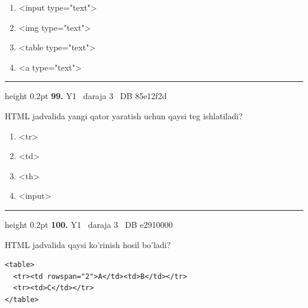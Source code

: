 \documentclass[10pt,a4paper,oneside]{article}
\begin{document}
\begin{enumerate}[label=\Alph*),leftmargin=9mm]
\item \textless{}input type="text"\textgreater{}
\item \textless{}img type="text"\textgreater{}
\item \textless{}table type="text"\textgreater{}
\item \textless{}a type="text"\textgreater{}
\end{enumerate}
\vspace{2mm}\hrule height 0.2pt \vspace{4mm}
\hypertarget{q99}{\textbf{\color{ink}99.}}  {\color{muted}\scriptsize Y1 \textbullet\ daraja 3 \textbullet\ DB 85e12f2d}
\par
HTML jadvalida yangi qator yaratish uchun qaysi teg ishlatiladi?
\begin{enumerate}[label=\Alph*),leftmargin=9mm]
\item \textless{}tr\textgreater{}
\item \textless{}td\textgreater{}
\item \textless{}th\textgreater{}
\item \textless{}input\textgreater{}
\end{enumerate}
\vspace{2mm}\hrule height 0.2pt \vspace{4mm}
\hypertarget{q100}{\textbf{\color{ink}100.}}  {\color{muted}\scriptsize Y1 \textbullet\ daraja 3 \textbullet\ DB e2910000}
\par
HTML jadvalida qaysi ko'rinish hosil bo'ladi?\par
\begin{lstlisting}
<table>
  <tr><td rowspan="2">A</td><td>B</td></tr>
  <tr><td>C</td></tr>
</table>
\end{lstlisting}
\end{document}
